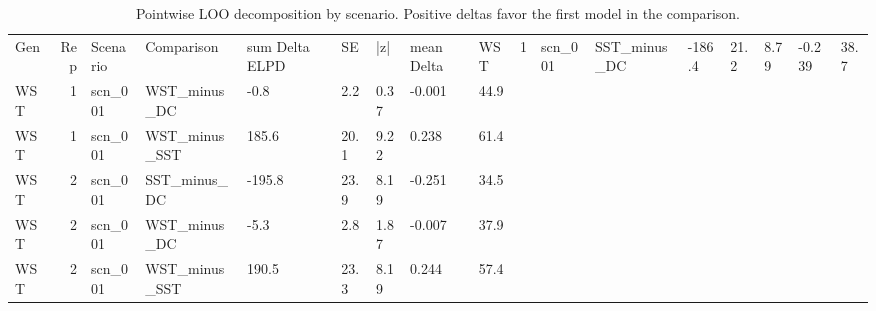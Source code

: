 \begin{table}[!h]
\centering
\caption{Pointwise LOO decomposition by scenario. Positive deltas favor the first model in the comparison.}
\centering
\begin{tabular}[t]{lrlllllll}
\toprule
Gen & Rep & Scenario & Comparison & sum Delta ELPD & SE & |z| & mean Delta & %
\midrule
WST & 1 & scn_001 & SST_minus_DC & -186.4 & 21.2 & 8.79 & -0.239 & 38.7\\
WST & 1 & scn_001 & WST_minus_DC & -0.8 & 2.2 & 0.37 & -0.001 & 44.9\\
WST & 1 & scn_001 & WST_minus_SST & 185.6 & 20.1 & 9.22 & 0.238 & 61.4\\
WST & 2 & scn_001 & SST_minus_DC & -195.8 & 23.9 & 8.19 & -0.251 & 34.5\\
WST & 2 & scn_001 & WST_minus_DC & -5.3 & 2.8 & 1.87 & -0.007 & 37.9\\
\addlinespace
WST & 2 & scn_001 & WST_minus_SST & 190.5 & 23.3 & 8.19 & 0.244 & 57.4\\
\bottomrule
\end{tabular}
\end{table}
